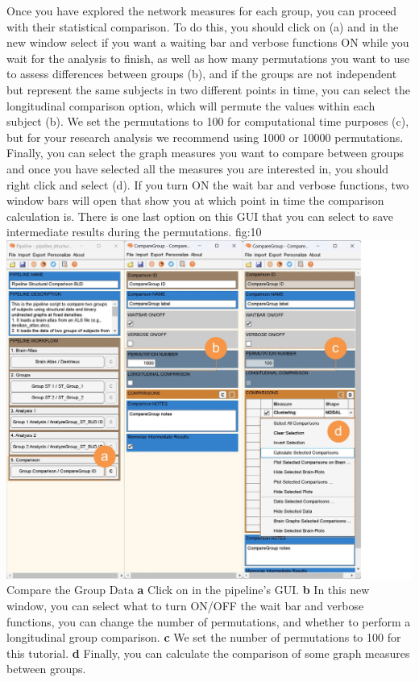 \documentclass[justified]{tufte-handout}
\begin{document}
Once you have explored the network measures for each group, you can proceed with their statistical comparison. To do this, you should click on  (a) and in the new window select if you want a waiting bar and verbose functions ON while you wait for the analysis to finish, as well as how many permutations you want to use to assess differences between groups ({b}), and if the groups are not independent but represent the same subjects in two different points in time, you can select the longitudinal comparison option, which will permute the values within each subject ({b}). We set the permutations to 100 for computational time purposes ({c}), but for your research analysis we recommend using 1000 or 10000 permutations. Finally, you can select the graph measures you want to compare between groups and once you have selected all the measures you are interested in, you should right click and select  ({d}). If you turn ON the wait bar and verbose functions, two window bars will open that show you at which point in time the comparison calculation is. There is one last option on this GUI that you can select to save intermediate results during the permutations.
	{fig:10}
	{
	\includegraphics{fig10.jpg}
	}
	{Compare the Group Data}
	{
	{\bf a} Click on  in the pipeline's GUI.
	{\bf b} In this new window, you can select what to turn ON/OFF the wait bar and verbose functions, you can change the number of permutations, and whether to perform a longitudinal group comparison. {\bf c} We set the number of permutations to 100 for this tutorial. {\bf d} Finally, you can calculate the comparison of some graph measures between groups.
	}
 
\end{document}
